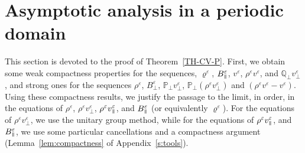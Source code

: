 \documentclass[11pt,reqno]{amsart}
\def \Q{{\mathbb{Q}}}
\def \P{{\mathbb{P}}}
\newcommand{\myparallel}{{\mkern3mu\vphantom{\perp}\vrule depth 0pt\mkern2mu\vrule depth 0pt\mkern3mu}}
\begin{document}

\section{Asymptotic analysis in a periodic domain}
\label{s:AAPD}
This section is devoted to the proof of Theorem~\ref{TH-CV-P}. First, we obtain some weak compactness properties for the sequences, $\varrho^\varepsilon$,  $B_\myparallel^\varepsilon$, $v^\varepsilon$,  $\rho^\varepsilon v^\varepsilon$, and $\Q_\perp v_\perp^\varepsilon$, and strong ones for the sequences $\rho^\varepsilon$, $B_\perp^\varepsilon$, $\P_\perp v_\perp^\varepsilon$,  $\P_\perp(\rho^\varepsilon v_\perp^\varepsilon)$ and $(\rho^\varepsilon v^\varepsilon - v^\varepsilon)$. Using these compactness results, we justify the passage to the limit, in order, in the equations of $\rho^\varepsilon$, $\rho^\varepsilon v_\perp^\varepsilon$, $\rho^\varepsilon v_\myparallel^\varepsilon$, and $B_\myparallel^\varepsilon$ (or equivalently $\varrho^\varepsilon$). For the equations of  $\rho^\varepsilon v_\perp^\varepsilon$, we use the unitary group method, while for the equations of $\rho^\varepsilon v_\myparallel^\varepsilon$, and $B_\myparallel^\varepsilon$, we use some particular cancellations and a compactness argument (Lemma~\ref{lem:compactness} of Appendix~\ref{s:tools}).

\end{document}
